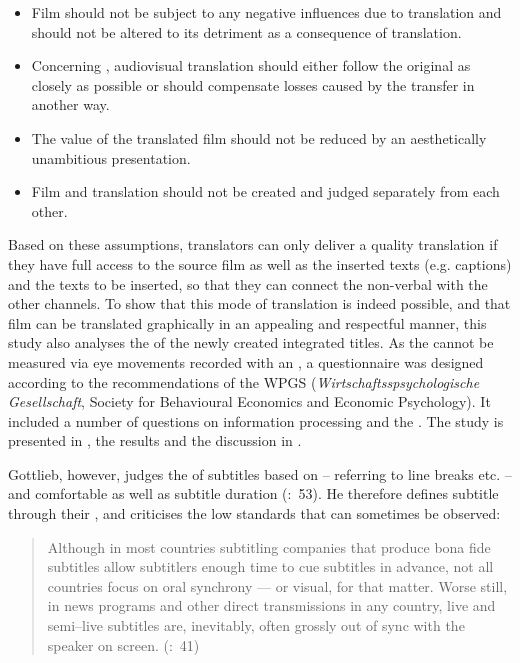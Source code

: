 \begin{itemize}
\item Film should not be subject to any negative influences due to translation and should not be altered to its detriment as a consequence of translation.
\item Concerning , audiovisual translation should either follow the original as closely as possible or should compensate losses caused by the transfer in another way.
\item The value of the translated film should not be reduced by an aesthetically unambitious presentation.
\item Film and translation should not be created and judged separately from each other.
\end{itemize}

Based on these assumptions, translators can only deliver a quality translation if they have full access to the source film as well as the inserted texts (e.g. captions) and the texts to be inserted, so that they can connect the non-verbal  with the other channels. To show that this mode of translation is indeed possible, and that film can be translated graphically in an appealing and respectful manner, this study also analyses the  of the newly created integrated titles. As the  cannot be measured via eye movements recorded with an , a questionnaire was designed according to the recommendations of the WPGS (\textit{Wirtschaftsspsychologische Gesellschaft}, Society for Behavioural Economics and Economic Psychology). It included a number of questions on information processing and the . The study is presented in , the results and the discussion in .



Gottlieb, however, judges the  of subtitles based on  – referring to line breaks etc. – and comfortable  as well as subtitle duration (\citeyear{Gottlieb2012}:~53). He therefore defines subtitle  through their , and criticises the low standards that can sometimes be observed:

\begin{quote}
Although in most countries subtitling companies that produce bona fide subtitles allow subtitlers enough time to cue subtitles in advance, not all countries focus on oral synchrony — or visual, for that matter. Worse still, in news programs and other direct transmissions in any country, live and semi–live subtitles are, inevitably, often grossly out of sync with the speaker on screen. (\citealt{Gottlieb2012}:~41)
\end{quote}

